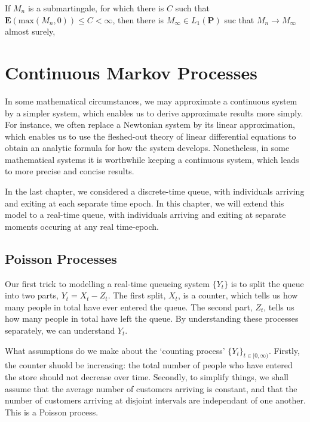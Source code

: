 \begin{theorem}
    If $M_n$ is a submartingale, for which there is $C$ such that $\mathbf{E}(\text{max}(M_n, 0)) \leq C < \infty$, then there is $M_\infty \in L_1(\mathbf{P})$ suc that $M_n \to M_\infty$ almost surely,
\end{theorem}


\chapter{Continuous Markov Processes}

In some mathematical circumstances, we may approximate a continuous system by a simpler system, which enables us to derive approximate results more simply. For instance, we often replace a Newtonian system by its linear approximation, which enables us to use the fleshed-out theory of linear differential equations to obtain an analytic formula for how the system develops. Nonetheless, in some mathematical systems it is worthwhile keeping a continuous system, which leads to more precise and concise results.

In the last chapter, we considered a discrete-time queue, with individuals arriving and exiting at each separate time epoch. In this chapter, we will extend this model to a real-time queue, with individuals arriving and exiting at separate moments occuring at any real time-epoch.

\section{Poisson Processes}

Our first trick to modelling a real-time queueing system $\{ Y_t \}$ is to split the queue into two parts, $Y_t = X_t - Z_t$. The first split, $X_t$, is a counter, which tells us how many people in total have ever entered the queue. The second part, $Z_t$, tells us how many people in total have left the queue. By understanding these processes separately, we can understand $Y_t$.

What assumptions do we make about the `counting process' $\{ Y_t \}_{t \in [0,\infty)}$. Firstly, the counter shuold be increasing: the total number of people who have entered the store should not decrease over time. Secondly, to simplify things, we shall assume that the average number of customers arriving is constant, and that the number of customers arriving at disjoint intervals are independant of one another. This is a Poisson process.

